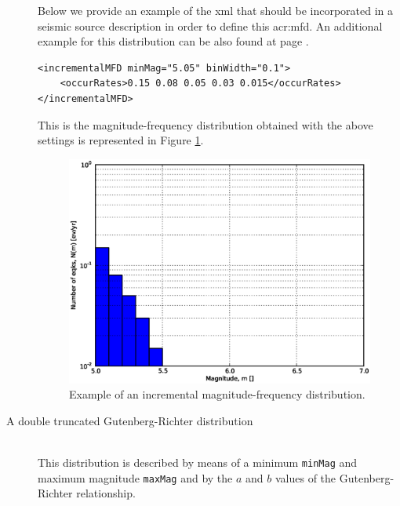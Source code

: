\begin{description}
    Below we provide an example of the xml that should
    be incorporated in a seismic source description in order to define 
    this \gls{acr:mfd}. An additional example for this distribution can
    be also found at page \pageref{example_incremental_mfd}.
\begin{Verbatim}[frame=single, commandchars=\\\{\}, fontsize=\footnotesize]
<incrementalMFD minMag="5.05" binWidth="0.1">
    <occurRates>0.15 0.08 0.05 0.03 0.015</occurRates>
</incrementalMFD>
\end{Verbatim}
    This is the magnitude-frequency distribution obtained with the above
    settings is represented in Figure \ref{fig:evenly_discretized_mfd}.
\begin{figure}[!ht]
\centering
\includegraphics[width=12cm]{./figures/hazard/ed_mfd.eps}
\caption{Example of an incremental magnitude-frequency distribution.}
\label{fig:evenly_discretized_mfd}
\end{figure}
%
\item[A double truncated Gutenberg-Richter distribution] \hfill \\
    This distribution is de\-scribed by means of a minimum \texttt{minMag}
    and maximum magnitude \texttt{maxMag} and by the $a$ and $b$ values 
    of the Gutenberg-Richter relationship. 
    

\end{description}
